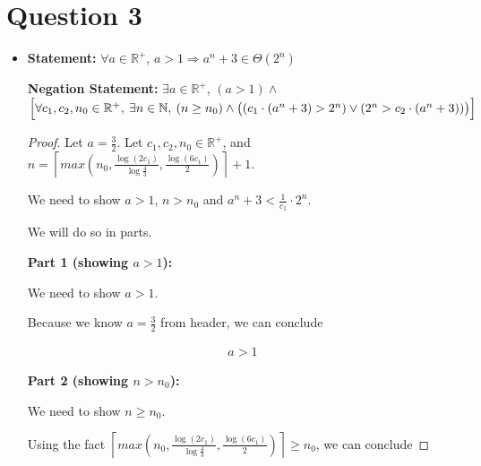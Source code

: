 \documentclass[12pt]{article}
\begin{document}
\section*{Question 3}
\begin{itemize}
    \item

    \textbf{Statement:} $\forall a \in \mathbb{R}^{+}$, $a > 1 \Rightarrow a^n + 3 \in \Theta(2^n)$

    \bigskip

    \textbf{Negation Statement:} $\exists a \in \mathbb{R}^{+}$, $(a > 1) \land $
    $\Bigl[ \forall c_1,c_2,n_0 \in \mathbb{R}^{+},\:\exists n \in \mathbb{N},\:
    (n \geq n_0) \land \bigl( (c_1 \cdot (a^n+3) > 2^n) \lor (2^n > c_2 \cdot (a^n+3)) \bigr) \Bigr]$

    \bigskip

    \begin{proof}

        Let $a = \frac{3}{2}$. Let $c_1,c_2,n_0 \in \mathbb{R}^{+}$, and $n = \left\lceil max(n_0, \frac{\log(2c_1)}{\log \frac{4}{3}}, \frac{\log(6c_1)}{2}) \right\rceil + 1$.

        \bigskip

        We need to show $a > 1$, $n > n_0$ and $a^n + 3 < \frac{1}{c_1} \cdot 2^n$.

        \bigskip

        We will do so in parts.

        \bigskip

        \textbf{Part 1 (showing $a > 1$):}

        \bigskip

        We need to show $a > 1$.

        \bigskip

        Because we know $a = \frac{3}{2}$ from header, we can conclude

        \setcounter{equation}{0}
        \begin{align}
            a > 1
        \end{align}

        \bigskip

        \textbf{Part 2 (showing $n > n_0$):}

        \bigskip

        We need to show $n \geq n_0$.

        \bigskip

        Using the fact $\left\lceil max(n_0, \frac{\log(2c_1)}{\log \frac{4}{3}},
        \frac{\log(6c_1)}{2}) \right\rceil \geq n_0$, we can conclude


\end{proof}
\end{itemize}
\end{document}
